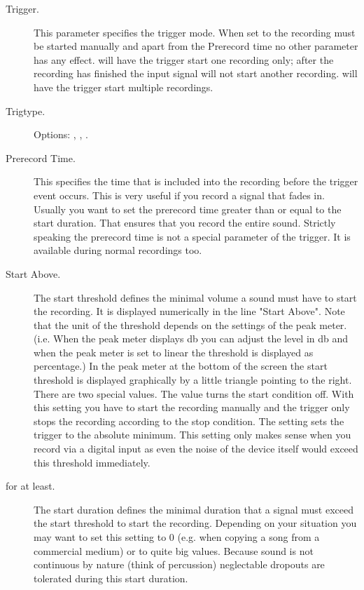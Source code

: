   \begin{description}
  \item[Trigger.]
	This parameter specifies the trigger mode.  When set to 
	the recording must be started manually and apart from the Prerecord time no
	other parameter has any effect.   will have the trigger start
	one recording only; after the recording has finished the input signal will
	not start another recording.  will have the trigger start 
	multiple recordings.
	
  \item[Trigtype.]
	Options: , , .
	
  \item[Prerecord Time.]
    This specifies the time that is included into the recording before the
	trigger event occurs. This is very useful if you record a signal that
       fades in. Usually you want to set the prerecord time greater than or
	equal to the start duration. That ensures that you record the entire
	sound. Strictly speaking the prerecord time is not a special parameter
	of the trigger. It is available during normal recordings too.
	
  \item[Start Above.]
	The start threshold defines the minimal volume a sound must have to start the
	recording. It is displayed numerically in the line "Start Above". Note that
	the unit of the threshold depends on the settings of the peak meter. (i.e.
	When the peak meter displays db you can adjust the level in db and when the
	peak meter is set to linear the threshold is displayed as percentage.) In the
	peak meter at the bottom of the screen the start threshold is displayed
	graphically by a little triangle pointing to the right. There are two special
	values. The value  turns the start condition off.  With this
	setting you have to start the recording manually and the trigger only stops
	the recording according to the stop condition. The setting 
	sets the trigger to the absolute minimum. This setting only makes sense when
	you record via a digital input as even the noise of the device itself would
	exceed this threshold immediately.
	
  \item[for at least.]
	The start duration defines the minimal duration that a signal must exceed the
	start threshold to start the recording. Depending on your situation you may
	want to set this setting to 0 (e.g. when copying a song from a commercial
	medium) or to quite big values. Because sound is not continuous by nature
	(think of percussion) neglectable dropouts are tolerated during this start
	duration.
	

\end{description}
